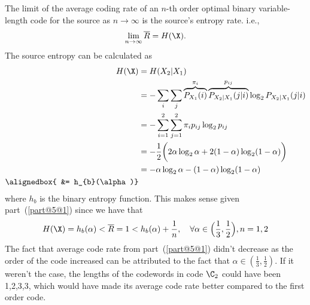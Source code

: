 \documentclass[
  coursecode={MTHE 474},
  assignmentname={Homework \homeworknumber},
  studentnumber=20053722,
  name={Bryan Hoang},
  draft,
]{
  ltxanswer%
}
\begin{document}
\begin{questions}
\begin{parts}
      \part{}
      \begin{solution}
        The limit of the average coding rate of an \(n\)-th order optimal binary variable-length code for the source as \(n\to\infty\) is the source's entropy rate. i.e.,
        \begin{equation*}
          \lim_{n\to\infty} \overline{R} = H(\X).
        \end{equation*}
        The source entropy can be calculated as
        \begin{align*}
          H(\X)        &= H(X_{2}|X_{1})                                                                                                           \\
                       &=-\sum_{i}\sum_{j} \overbrace{P_{X_{1}}(i)}^{\pi_{i}}\overbrace{P_{X_{2}|X_{1}}(j|i)}^{p_{ij}}\log_{2}P_{X_{2}|X_{1}}(j|i) \\
                       &=-\sum_{i=1}^{2}\sum_{j=1}^{2} \pi_{i}p_{ij}\log_{2}p_{ij}                                                                 \\
                       &= -\frac{1}{2}\biggl(2\alpha\log_{2}\alpha+2(1-\alpha)\log_{2}(1-\alpha)\biggr)                                            \\
                       &= -\alpha\log_{2}\alpha-(1-\alpha)\log_{2}(1-\alpha)                                                                       \\
          \alignedbox{ &= h_{b}(\alpha)}
        \end{align*}
        where \(h_{b}\) is the binary entropy function. This makes sense given part~(\ref{part@5@1}) since we have that
        \begin{equation*}
          H(\X) = h_{b}(\alpha) < \overline{R} = 1 < h_{b}(\alpha) + \frac{1}{n}, \quad \forall \alpha\in\Bigl(\frac{1}{3},\frac{1}{2}\Bigr), n=1,2
        \end{equation*}
        The fact that average code rate from part~(\ref{part@5@1}) didn't decrease as the order of the code increased can be attributed to the fact that \(\alpha\in(\frac{1}{3},\frac{1}{2})\). If it weren't the case, the lengths of the codewords in code \(\C_{2}\) could have been 1,2,3,3, which would have made its average code rate better compared to the first order code.
      \end{solution}
    \end{parts}
  \end{questions}
\end{document}
